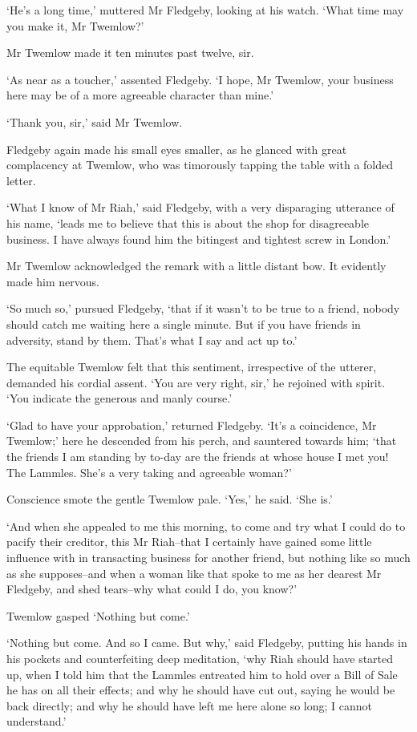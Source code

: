 ‘He’s a long time,’ muttered Mr Fledgeby, looking at his watch. ‘What
time may you make it, Mr Twemlow?’

Mr Twemlow made it ten minutes past twelve, sir.

‘As near as a toucher,’ assented Fledgeby. ‘I hope, Mr Twemlow, your
business here may be of a more agreeable character than mine.’

‘Thank you, sir,’ said Mr Twemlow.

Fledgeby again made his small eyes smaller, as he glanced with great
complacency at Twemlow, who was timorously tapping the table with a
folded letter.

‘What I know of Mr Riah,’ said Fledgeby, with a very disparaging
utterance of his name, ‘leads me to believe that this is about the shop
for disagreeable business. I have always found him the bitingest and
tightest screw in London.’

Mr Twemlow acknowledged the remark with a little distant bow. It
evidently made him nervous.

‘So much so,’ pursued Fledgeby, ‘that if it wasn’t to be true to a
friend, nobody should catch me waiting here a single minute. But if you
have friends in adversity, stand by them. That’s what I say and act up
to.’

The equitable Twemlow felt that this sentiment, irrespective of the
utterer, demanded his cordial assent. ‘You are very right, sir,’ he
rejoined with spirit. ‘You indicate the generous and manly course.’

‘Glad to have your approbation,’ returned Fledgeby. ‘It’s a coincidence,
Mr Twemlow;’ here he descended from his perch, and sauntered towards
him; ‘that the friends I am standing by to-day are the friends at whose
house I met you! The Lammles. She’s a very taking and agreeable woman?’

Conscience smote the gentle Twemlow pale. ‘Yes,’ he said. ‘She is.’

‘And when she appealed to me this morning, to come and try what I could
do to pacify their creditor, this Mr Riah--that I certainly have gained
some little influence with in transacting business for another friend,
but nothing like so much as she supposes--and when a woman like that
spoke to me as her dearest Mr Fledgeby, and shed tears--why what could I
do, you know?’

Twemlow gasped ‘Nothing but come.’

‘Nothing but come. And so I came. But why,’ said Fledgeby, putting
his hands in his pockets and counterfeiting deep meditation, ‘why Riah
should have started up, when I told him that the Lammles entreated him
to hold over a Bill of Sale he has on all their effects; and why he
should have cut out, saying he would be back directly; and why he should
have left me here alone so long; I cannot understand.’

